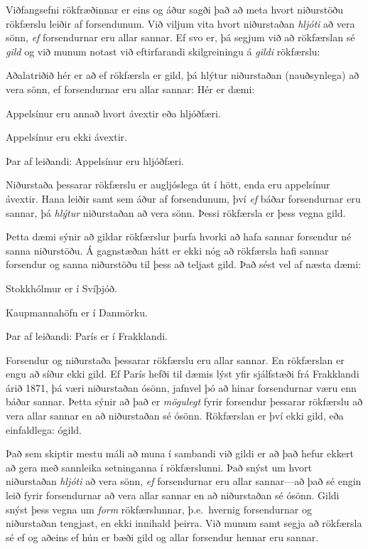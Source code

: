 Viðfangsefni rökfræðinnar er eins og áður sagði það að meta hvort niðurstöðu rökfærslu leiðir af forsendunum. Við viljum vita hvort niðurstaðan \emph{hljóti} að vera sönn, \emph{ef} forsendurnar eru allar sannar. Ef svo er, þá segjum við að rökfærslan sé \emph{gild} og við munum notast við eftirfarandi skilgreiningu á \emph{gildi} rökfærslu: 

Aðalatriðið hér er að ef rökfærsla er gild, þá hlýtur niðurstaðan (nauðsynlega) að vera sönn, ef forsendurnar eru allar sannar: Hér er dæmi:	
	
	\begin{earg}
		\item[] Appelsínur eru annað hvort ávextir eða hljóðfæri.
		\item[] Appelsínur eru ekki ávextir.
		\item[Þar af leiðandi:] Appelsínur eru hljóðfæri.
	\end{earg}
Niðurstaða þessarar rökfærslu er augljóslega út í hött, enda eru appelsínur ávextir. Hana leiðir samt sem áður af forsendunum, því \emph{ef} báðar forsendurnar eru sannar, þá \emph{hlýtur} niðurstaðan að vera sönn. Þessi rökfærsla er þess vegna gild.

Þetta dæmi sýnir að gildar rökfærslur þurfa hvorki að hafa sannar forsendur né sanna niðurstöðu. Á gagnstæðan hátt er ekki nóg að rökfærsla hafi sannar forsendur og sanna niðurstöðu til þess að teljast gild. Það sést vel af næsta dæmi:
	
	\begin{earg}
		\item[] Stokkhólmur er í Svíþjóð.
		\item[] Kaupmannahöfn er í Danmörku.
		\item[Þar af leiðandi:] París er í Frakklandi.
	\end{earg}
Forsendur og niðurstaða þessarar rökfærslu eru allar sannar. En rökfærslan er engu að síður ekki gild. Ef París hefði til dæmis lýst yfir sjálfstæði frá Frakklandi árið 1871, þá væri niðurstaðan ósönn, jafnvel þó að hinar forsendurnar væru enn báðar sannar. Þetta sýnir að það er \emph{mögulegt} fyrir forsendur þessarar rökfærslu að vera allar sannar en að niðurstaðan sé ósönn. Rökfærslan er því ekki gild, eða einfaldlega: ógild.

Það sem skiptir mestu máli að muna í sambandi við gildi er að það hefur ekkert að gera með sannleika setninganna í rökfærslunni. Það snýst um hvort niðurstaðan \emph{hljóti} að vera sönn, \emph{ef} forsendurnar eru allar sannar---að það sé engin leið fyrir forsendurnar að vera allar sannar en að niðurstaðan sé ósönn. Gildi snýst þess vegna um \emph{form} rökfærslunnar, þ.e.\ hvernig forsendurnar og niðurstaðan tengjast, en ekki innihald þeirra. Við munum samt segja að rökfærsla sé  ef og aðeins ef hún er bæði gild og allar forsendur hennar eru sannar.

